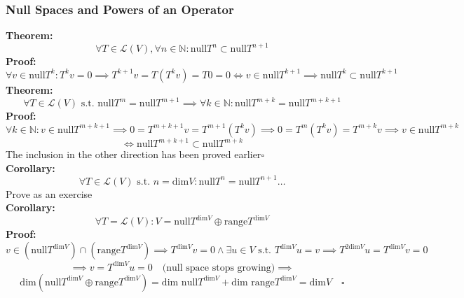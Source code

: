 \documentclass{article}
\newcommand{\N}{\mathbb{N}}
\newcommand{\st}{\mbox{ s.t. }}
\newcommand{\0}{{\bf{0}}}
\begin{document}
\subsubsection{Null Spaces and Powers of an Operator}
\textbf{Theorem:}
$$\forall T\in\mathcal{L}(V),\forall n\in\N:\mbox{null}T^n\subset\mbox{null}T^{n+1}$$
\textbf{Proof:}
$$\forall v\in\mbox{null}T^k:T^kv=0\implies T^{k+1}v=T\left(T^kv\right)=T0=0\iff v\in\mbox{null}T^{k+1}\implies\mbox{null}T^k\subset\mbox{null}T^{k+1}$$
\textbf{Theorem:}
$$\forall T\in\mathcal{L}(V)\st\mbox{null}T^m=\mbox{null}T^{m+1}\implies\forall k\in\N:\mbox{null}T^{m+k}=\mbox{null}T^{m+k+1}$$
\textbf{Proof:}
$$\forall k\in\N:v\in\mbox{null}T^{m+k+1}\implies0=T^{m+k+1}v=T^{m+1}(T^kv)\implies0=T^m(T^kv)=T^{m+k}v\implies v\in\mbox{null}T^{m+k}$$
$$\iff\mbox{null}T^{m+k+1}\subset\mbox{null}T^{m+k}$$
The inclusion in the other direction has been proved earlier\quad$\square$\\
\textbf{Corollary:}
$$\forall T\in\mathcal{L}(V)\st n=\mbox{dim}V:\mbox{null}T^n=\mbox{null}T^{n+1}\dots$$
\null\hfill{Prove as an exercise}\\
\textbf{Corollary:}
$$\forall T=\mathcal{L}(V):V=\mbox{null}T^{\mbox{dim}V}\oplus\mbox{range}T^{\mbox{dim}V}$$
\textbf{Proof:}
$$v\in\left(\mbox{null}T^{\mbox{dim}V}\right)\cap\left(\mbox{range}T^{\mbox{dim}V}\right)\implies T^{\mbox{dim}V}v=0\land\exists u\in V\st T^{\mbox{dim}V}u=v\implies T^{2\mbox{dim}V}u=T^{\mbox{dim}V}v=0$$
$$\implies v=T^{\mbox{dim}V}u=0\quad\mbox{(null space stops growing)}\implies$$
$$\mbox{dim}\left(\mbox{null}T^{\mbox{dim}V}\oplus\mbox{range}T^{\mbox{dim}V}\right)=\mbox{dim null}T^{\mbox{dim}V}+\mbox{dim range}T^{\mbox{dim}V}=\mbox{dim}V\quad\square$$
\end{document}
